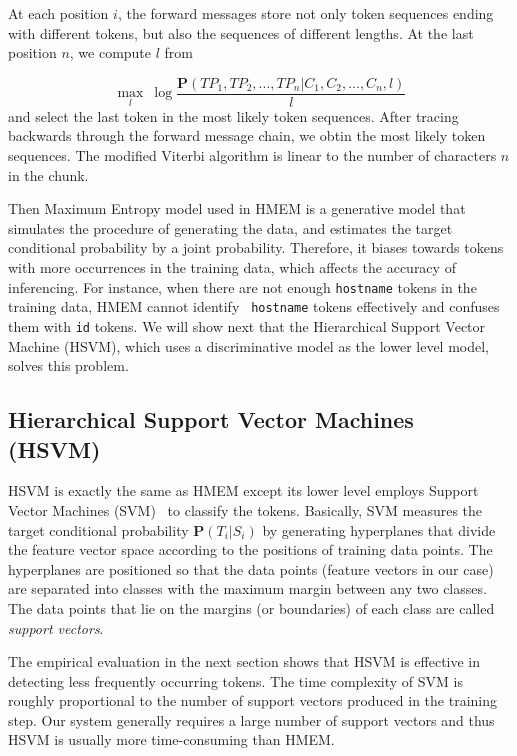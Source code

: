 At each position $i$, the forward messages store not only token
sequences ending with different tokens, but also the sequences of different
lengths. At the last position $n$, we compute $l$ from 

\begin{equation}
\max_{l}~ \log \frac{\mathbf{P}(TP_1, TP_2, ...,
TP_n|C_1, C_2, ..., C_n,l)}{l}
\end{equation}
\noindent
and select the last token in the most likely token
sequences. After tracing backwards through the forward message chain,
we obtin the most likely token sequences. The modified Viterbi
algorithm is linear to the number of characters $n$ in the chunk.


Then Maximum Entropy model used in HMEM is a
generative model that simulates the procedure of generating the data, and
estimates the target conditional probability by a joint
probability. Therefore, it biases towards tokens with more
occurrences in the training data, which affects the accuracy of inferencing. 
For instance, when there are not enough
{\tt hostname} tokens in the training data, HMEM cannot identify {\tt
hostname} tokens effectively and confuses them with {\tt id}
tokens. We will show next that the Hierarchical
Support Vector Machine (HSVM), which uses a discriminative model as the
lower level model, solves this problem.

\subsection{Hierarchical Support Vector Machines (HSVM)}\label{subsec:hsvm}

HSVM is exactly the same as HMEM except its lower
level employs Support Vector Machines (SVM)~\cite{CC01a} to classify
the tokens. 
Basically, SVM measures the target conditional probability $\mathbf{P}(T_i|S_i)$ 
by generating hyperplanes that divide the feature vector space according to the
positions of training data points. The hyperplanes are positioned so that the
data points (feature vectors in our case) are separated into classes with
the maximum margin between any two classes. The data points that lie on
the margins (or boundaries) of each class are called {\em support vectors}. 

The empirical evaluation in the next section shows that HSVM is
effective in detecting less frequently occurring tokens. The time
complexity of SVM is roughly proportional to the number of support
vectors produced in the training step. Our system generally requires a
large number of support vectors and thus HSVM is usually more
time-consuming than HMEM.
